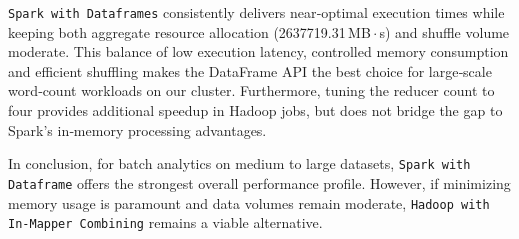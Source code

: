 \texttt{Spark with Dataframes} consistently delivers near‑optimal execution times while keeping both aggregate resource allocation (2637719.31\,MB\,$\cdot$\,s) and shuffle volume moderate. This balance of low execution latency, controlled memory consumption and efficient shuffling makes the DataFrame API the best choice for large‑scale word‑count workloads on our cluster. Furthermore, tuning the reducer count to four provides additional speedup in Hadoop jobs, but does not bridge the gap to Spark’s in‑memory processing advantages.

In conclusion, for batch analytics on medium to large datasets, \texttt{Spark with Dataframe} offers the strongest overall performance profile. However, if minimizing memory usage is paramount and data volumes remain moderate, \texttt{Hadoop with In-Mapper Combining} remains a viable alternative.
